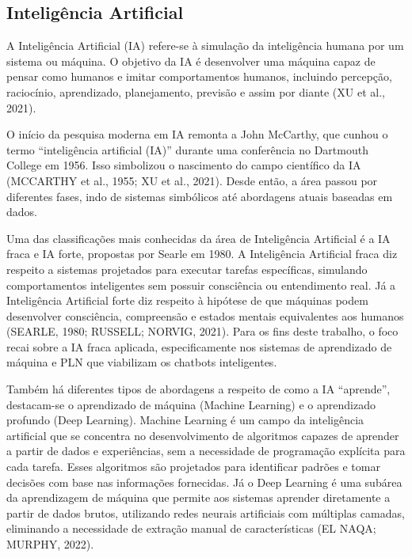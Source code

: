 \documentclass[12pt,a4paper]{extarticle}
\begin{document}
\subsection{Inteligência Artificial}

A Inteligência Artificial (IA) refere-se à simulação da inteligência humana por um sistema ou máquina. O objetivo da IA é desenvolver uma máquina capaz de pensar como humanos e imitar comportamentos humanos, incluindo percepção, raciocínio, aprendizado, planejamento, previsão e assim por diante (XU et al., 2021).

O início da pesquisa moderna em IA remonta a John McCarthy, que cunhou o termo ``inteligência artificial (IA)'' durante uma conferência no Dartmouth College em 1956. Isso simbolizou o nascimento do campo científico da IA (MCCARTHY et al., 1955; XU et al., 2021). Desde então, a área passou por diferentes fases, indo de sistemas simbólicos até abordagens atuais baseadas em dados.

Uma das classificações mais conhecidas da área de Inteligência Artificial é a IA fraca e IA forte, propostas por Searle em 1980. A Inteligência Artificial fraca diz respeito a sistemas projetados para executar tarefas específicas, simulando comportamentos inteligentes sem possuir consciência ou entendimento real. Já a Inteligência Artificial forte diz respeito à hipótese de que máquinas podem desenvolver consciência, compreensão e estados mentais equivalentes aos humanos (SEARLE, 1980; RUSSELL; NORVIG, 2021). Para os fins deste trabalho, o foco recai sobre a IA fraca aplicada, especificamente nos sistemas de aprendizado de máquina e PLN que viabilizam os chatbots inteligentes.

Também há diferentes tipos de abordagens a respeito de como a IA ``aprende'', destacam-se o aprendizado de máquina (Machine Learning) e o aprendizado profundo (Deep Learning). Machine Learning é um campo da inteligência artificial que se concentra no desenvolvimento de algoritmos capazes de aprender a partir de dados e experiências, sem a necessidade de programação explícita para cada tarefa. Esses algoritmos são projetados para identificar padrões e tomar decisões com base nas informações fornecidas. Já o Deep Learning é uma subárea da aprendizagem de máquina que permite aos sistemas aprender diretamente a partir de dados brutos, utilizando redes neurais artificiais com múltiplas camadas, eliminando a necessidade de extração manual de características (EL NAQA; MURPHY, 2022).
\end{document}
